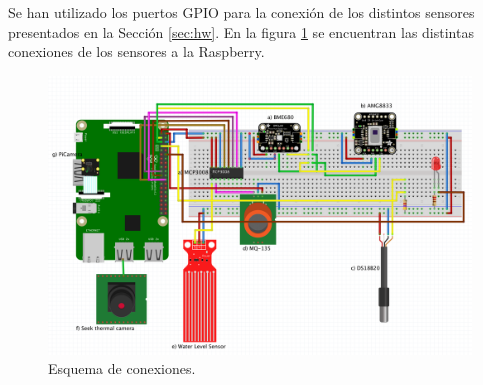 Se han utilizado los puertos GPIO para la conexión de los distintos sensores presentados en la Sección \ref{sec:hw}. En la figura \ref{fig:esquema} se encuentran las distintas conexiones de los sensores a la Raspberry.\\
\begin{figure} [h!]
  \begin{center}
    \includegraphics[width=14cm]{figs/esquema}
  \end{center}
  \caption{Esquema de conexiones.}
  \label{fig:esquema}
\end{figure}

